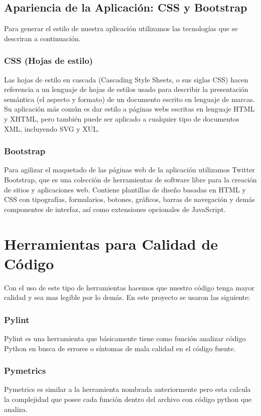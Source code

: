 \subsection{Apariencia de la Aplicación: CSS y Bootstrap}


Para generar el estilo de nuestra aplicación utilizamos las tecnologías que se descriran a continuación.

\subsubsection{CSS (Hojas de estilo)}
Las hojas de estilo en cascada (Cascading Style Sheets, o sus siglas CSS) hacen referencia a un 
lenguaje de hojas de estilos usado para describir la presentación semántica (el aspecto y formato) de un 
documento escrito en lenguaje de marcas. Su aplicación más común es dar estilo a páginas webs escritas en lenguaje HTML y XHTML, 
pero también puede ser aplicado a cualquier tipo de documentos XML, incluyendo SVG y XUL.

\subsubsection{Bootstrap}
Para agilizar el maquetado de las páginas web de la aplicación utilizamos Twitter Bootstrap, que es una colección de herramientas de software
libre para la creación de sitios y aplicaciones web. Contiene plantillas de diseño basadas en HTML y CSS con tipografías, 
formularios, botones, gráficos, barras de navegación y demás componentes de interfaz, así como extensiones opcionales de JavaScript.

\section{Herramientas para Calidad de Código}
\label{2:sec4}

Con el uso de este tipo de herramientas hacemos que nuestro código tenga mayor calidad y sea mas legible por lo demás. En este proyecto se usaron las siguiente:\\
\subsubsection{Pylint}
Pylint es una herramienta que básicamente tiene como función analizar código Python en busca de errores o síntomas de mala calidad en el código fuente.\\ 

\subsubsection{Pymetrics}
Pymetrics es similar a la herramienta nombrada anteriormente pero esta calcula la complejidad que posee cada función dentro del archivo con código python que analiza.\\
